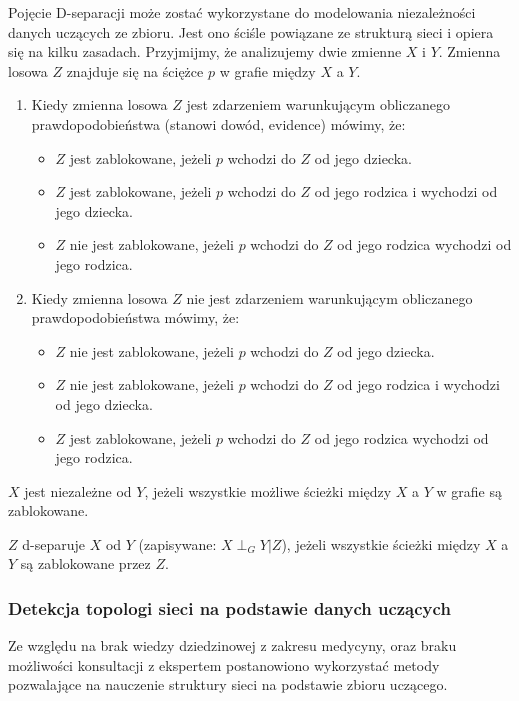\documentclass{article}
\begin{document}
Pojęcie D-separacji może zostać wykorzystane do modelowania niezależności danych uczących ze zbioru. Jest ono ściśle powiązane ze strukturą sieci i opiera się na kilku zasadach. Przyjmijmy, że analizujemy dwie zmienne $X$ i $Y$. Zmienna losowa $Z$ znajduje się na ściężce $p$ w grafie między $X$ a $Y$.
\begin{enumerate}
\item Kiedy zmienna losowa $Z$ jest zdarzeniem warunkującym obliczanego prawdopodobieństwa (stanowi dowód, evidence) mówimy, że:
\begin{itemize}
 \item $Z$ jest zablokowane, jeżeli $p$ wchodzi do $Z$ od jego dziecka.
 \item $Z$ jest zablokowane, jeżeli $p$ wchodzi do $Z$ od jego rodzica i wychodzi od jego dziecka.
 \item $Z$ nie jest zablokowane, jeżeli $p$ wchodzi do $Z$ od jego rodzica wychodzi od jego rodzica.
\end{itemize}
\item Kiedy zmienna losowa $Z$ nie jest zdarzeniem warunkującym obliczanego prawdopodobieństwa mówimy, że:
\begin{itemize}
 \item $Z$ nie jest zablokowane, jeżeli $p$ wchodzi do $Z$ od jego dziecka.
 \item $Z$ nie jest zablokowane, jeżeli $p$ wchodzi do $Z$ od jego rodzica i wychodzi od jego dziecka.
 \item $Z$ jest zablokowane, jeżeli $p$ wchodzi do $Z$ od jego rodzica wychodzi od jego rodzica.
\end{itemize}
\end{enumerate}

$X$ jest niezależne od $Y$, jeżeli wszystkie możliwe ścieżki między $X$ a $Y$ w grafie są zablokowane.

$Z$ d-separuje $X$ od $Y$ (zapisywane: $X \perp_G Y|Z$), jeżeli wszystkie ścieżki między $X$ a $Y$ są zablokowane przez $Z$.

\subsubsection{Detekcja topologi sieci na podstawie danych uczących}

Ze względu na brak wiedzy dziedzinowej z zakresu medycyny, oraz braku możliwości konsultacji z ekspertem postanowiono wykorzystać metody pozwalające na nauczenie struktury sieci na podstawie zbioru uczącego.
\end{document}
